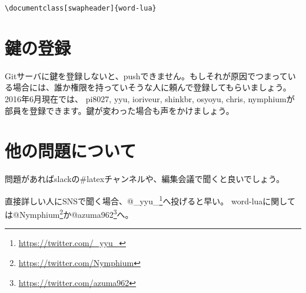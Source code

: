 \begin{lstlisting}[mathescape]
\documentclass[swapheader]{word-lua}
\end{lstlisting}

\section{鍵の登録}

Gitサーバに鍵を登録しないと、pushできません。もしそれが原因でつまっている場合には、誰か権限を持っていそうな人に頼んで登録してもらいましょう。2016年6月現在では、
pi8027, yyu, ioriveur, shinkbr, osyoyu, chris, nymphiumが部員を登録できます。鍵が変わった場合も声をかけましょう。

\section{他の問題について}

問題があればslackの\#latexチャンネルや、編集会議で聞くと良いでしょう。

直接詳しい人にSNSで聞く場合、@\_yyu\_\footnote{\url{https://twitter.com/_yyu_}}へ投げると早い。
word-luaに関しては@Nymphium\footnote{\url{https://twitter.com/Nymphium}}か@azuma962\footnote{\url{https://twitter.com/azuma962}}へ。



